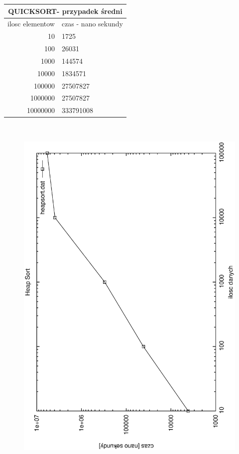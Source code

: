 \documentclass[a4paper,11pt]{report}
\begin{document}
\newpage
\begin{tabular}{|rl|}
\hline
\multicolumn{2}{|c|}{QUICKSORT- przypadek średni}\\
\hline
ilosc elementow & czas - nano sekundy\\
\hline
10&1725\\
100&26031\\
1000&144574\\
10000&1834571\\
100000&27507827\\
1000000&27507827\\
10000000&333791008\\
\hline
\end{tabular}
\\

\begin{figure}
  \begin{center}
    \includegraphics{wykresy/heapsort.eps}
    \caption{}
    \label{fig:}
  \end{center}
\end{figure}
\end{document}
